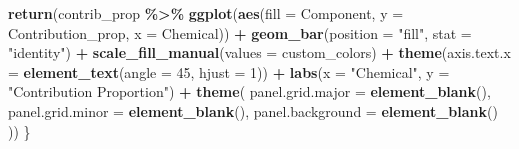 \documentclass[
]{article}
\newenvironment{Shaded}{\begin{snugshade}}{\end{snugshade}}
\newcommand{\AttributeTok}[1]{\textcolor[rgb]{0.13,0.29,0.53}{#1}}
\newcommand{\DecValTok}[1]{\textcolor[rgb]{0.00,0.00,0.81}{#1}}
\newcommand{\FunctionTok}[1]{\textcolor[rgb]{0.13,0.29,0.53}{\textbf{#1}}}
\newcommand{\NormalTok}[1]{#1}
\newcommand{\SpecialCharTok}[1]{\textcolor[rgb]{0.81,0.36,0.00}{\textbf{#1}}}
\newcommand{\StringTok}[1]{\textcolor[rgb]{0.31,0.60,0.02}{#1}}
\begin{document}
\begin{Shaded}
\begin{Highlighting}[]
  \FunctionTok{return}\NormalTok{(contrib\_prop }\SpecialCharTok{\%\textgreater{}\%}
    \FunctionTok{ggplot}\NormalTok{(}\FunctionTok{aes}\NormalTok{(}\AttributeTok{fill =}\NormalTok{ Component, }\AttributeTok{y =}\NormalTok{ Contribution\_prop, }\AttributeTok{x =}\NormalTok{ Chemical)) }\SpecialCharTok{+}
    \FunctionTok{geom\_bar}\NormalTok{(}\AttributeTok{position =} \StringTok{"fill"}\NormalTok{, }\AttributeTok{stat =} \StringTok{"identity"}\NormalTok{) }\SpecialCharTok{+}
    \FunctionTok{scale\_fill\_manual}\NormalTok{(}\AttributeTok{values =}\NormalTok{ custom\_colors) }\SpecialCharTok{+}
    \FunctionTok{theme}\NormalTok{(}\AttributeTok{axis.text.x =} \FunctionTok{element\_text}\NormalTok{(}\AttributeTok{angle =} \DecValTok{45}\NormalTok{, }\AttributeTok{hjust =} \DecValTok{1}\NormalTok{)) }\SpecialCharTok{+}
    \FunctionTok{labs}\NormalTok{(}\AttributeTok{x =} \StringTok{"Chemical"}\NormalTok{, }\AttributeTok{y =} \StringTok{"Contribution Proportion"}\NormalTok{) }\SpecialCharTok{+}
    \FunctionTok{theme}\NormalTok{(}
      \AttributeTok{panel.grid.major =} \FunctionTok{element\_blank}\NormalTok{(),}
      \AttributeTok{panel.grid.minor =} \FunctionTok{element\_blank}\NormalTok{(),}
      \AttributeTok{panel.background =} \FunctionTok{element\_blank}\NormalTok{()}
\NormalTok{    ))}
\NormalTok{\}}
\end{Highlighting}
\end{Shaded}
\end{document}
